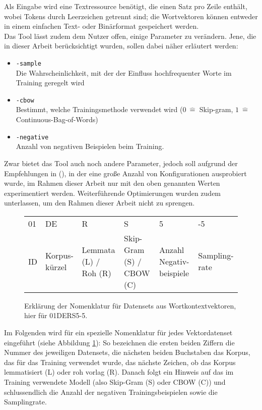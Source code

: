   Als Eingabe wird eine Textressource benötigt, die einen Satz pro Zeile enthält, wobei Tokens durch Leerzeichen getrennt sind;
  die Wortvektoren können entweder in einem einfachen Text- oder Binärformat gespeichert werden.\\
  Das Tool lässt zudem dem Nutzer offen, einige Parameter zu verändern. Jene, die in dieser Arbeit berücksichtigt wurden, sollen
  dabei näher erläutert werden:
  \begin{itemize}
    \item \verb|-sample|\\Die Wahrscheinlichkeit, mit der der Einfluss hochfrequenter Worte im Training geregelt wird
    \item \verb|-cbow|\\Bestimmt, welche Trainingsmethode verwendet wird ($0\ \hat{=}$ Skip-gram, $1\ \hat{=}$ Continuous-Bag-of-Words)
    \item \verb|-negative|\\Anzahl von negativen Beispielen beim Training.
  \end{itemize}

  Zwar bietet das Tool auch noch andere Parameter, jedoch soll aufgrund der Empfehlungen in (\citeauthor{levy2015improving}), in
  der eine große Anzahl von Konfigurationen ausprobiert wurde, im Rahmen dieser Arbeit nur mit den oben genannten Werten experimentiert werden.
  Weiterführende Optimierungen wurden zudem unterlassen, um den Rahmen dieser Arbeit nicht zu sprengen.\\

  \begin{figure}[h]
    \centering
    \begin{tabular}{L|L|L|L|L|L}
        \rowfont{\huge}%
        01 & DE & R & S & 5 & -5 \\
        \rowfont{\scriptsize}%
        ID & \parbox[t]{1cm}{Korpus-kürzel} & \parbox[t]{1cm}{Lemmata (L) / Roh (R)} & \parbox[t]{1.5cm}{Skip-Gram (S) / CBOW (C)} & \parbox[t]{1cm}{Anzahl Negativ-beispiele} & \parbox[t]{1.5cm}{Sampling-rate} \\
    \end{tabular}
  \caption[Erklärung der Nomenklatur für Datensets aus Wortkontextvektoren]{Erklärung der Nomenklatur für Datensets aus
  Wortkontextvektoren, hier für 01DERS5-5.\label{fig:nomenklatur}}
  \end{figure}

  Im Folgenden wird für ein spezielle Nomenklatur für jedes Vektordatenset eingeführt (siehe Abbildung \ref{fig:nomenklatur}):
  So bezeichnen die ersten beiden
  Ziffern die Nummer des jeweiligen Datensets, die nächsten beiden Buchstaben das Korpus, das für das Training verwendet
  wurde, das nächste Zeichen, ob das Korpus lemmatisiert (L) oder roh vorlag (R). Danach folgt ein Hinweis auf das im Training
  verwendete Modell (also Skip-Gram (S) oder CBOW (C)) und schlussendlich die Anzahl der negativen Trainingsbeispielen
  sowie die Samplingrate.


